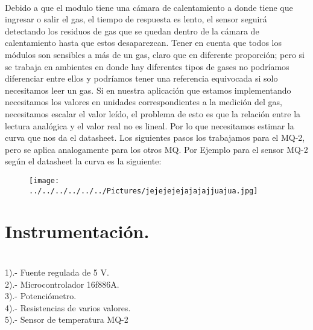 \documentclass[11pt,a4paper]{article}
\begin{document}
\\
Debido a que el modulo tiene una c\'{a}mara de calentamiento a donde tiene que ingresar o salir el gas, el tiempo de respuesta es lento, el sensor seguir\'{a} detectando los residuos de gas que se quedan dentro de la c\'{a}mara de calentamiento hasta que estos desaparezcan. Tener en cuenta que todos los m\'{o}dulos son sensibles a m\'{a}s de un gas, claro que en diferente proporci\'{o}n; pero si se trabaja en ambientes en donde hay diferentes tipos de gases no podr\'{i}amos diferenciar entre ellos y podr\'{i}amos tener una referencia equivocada si solo necesitamos leer un gas. Si en nuestra aplicaci\'{o}n que estamos implementando necesitamos los valores en unidades correspondientes a la medici\'{o}n del gas, necesitamos escalar el valor le\'{i}do, el problema de esto es que la relaci\'{o}n entre la lectura anal\'{o}gica y el valor real no es lineal. Por lo que necesitamos estimar la curva que nos da el datasheet. Los siguientes pasos los trabajamos para el MQ-2, pero se aplica analogamente para los otros MQ. Por Ejemplo para el sensor MQ-2 seg\'{u}n el datasheet la curva es la siguiente:
\begin{figure}[hbtp]
\centering
\texttt{[image: ../../../../../../Pictures/jejejejejajajajjuajua.jpg]}
\end{figure}

\section{Instrumentaci\'{o}n.}\\
1).- Fuente regulada de 5 V.\\
2).- Microcontrolador 16f886A.\\
3).- Potenci\'{o}metro.\\
4).- Resistencias de varios valores.\\
5).- Sensor de temperatura MQ-2\\
\pagebreak

\end{document}
